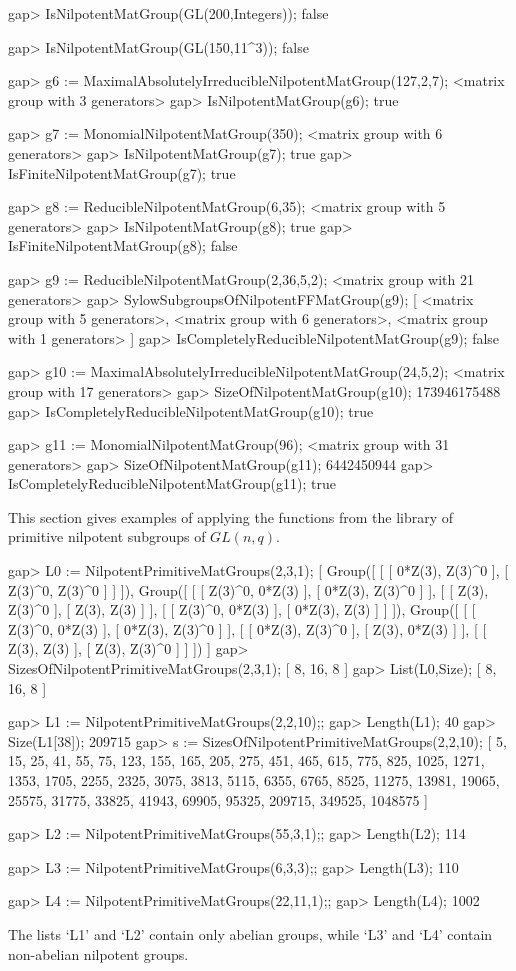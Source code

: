 \beginexample
gap> IsNilpotentMatGroup(GL(200,Integers));
false

gap> IsNilpotentMatGroup(GL(150,11^3));
false

gap> g6 := MaximalAbsolutelyIrreducibleNilpotentMatGroup(127,2,7);
<matrix group with 3 generators>
gap> IsNilpotentMatGroup(g6);
true

gap> g7 := MonomialNilpotentMatGroup(350);
<matrix group with 6 generators>
gap> IsNilpotentMatGroup(g7);
true
gap> IsFiniteNilpotentMatGroup(g7);
true

gap> g8 := ReducibleNilpotentMatGroup(6,35);
<matrix group with 5 generators>
gap> IsNilpotentMatGroup(g8);
true
gap> IsFiniteNilpotentMatGroup(g8);
false

gap> g9 := ReducibleNilpotentMatGroup(2,36,5,2);
<matrix group with 21 generators>
gap> SylowSubgroupsOfNilpotentFFMatGroup(g9);
[ <matrix group with 5 generators>, <matrix group with 6 generators>,
  <matrix group with 1 generators> ]
gap> IsCompletelyReducibleNilpotentMatGroup(g9);
false

gap> g10 := MaximalAbsolutelyIrreducibleNilpotentMatGroup(24,5,2);
<matrix group with 17 generators>
gap> SizeOfNilpotentMatGroup(g10);
173946175488
gap> IsCompletelyReducibleNilpotentMatGroup(g10);
true

gap> g11 := MonomialNilpotentMatGroup(96);
<matrix group with 31 generators>
gap> SizeOfNilpotentMatGroup(g11);
6442450944
gap> IsCompletelyReducibleNilpotentMatGroup(g11);
true
\endexample


This section gives examples of applying the functions from the
 library of primitive nilpotent subgroups of $GL(n,q)$.

\beginexample
gap> L0 := NilpotentPrimitiveMatGroups(2,3,1);
[ Group([ [ [ 0*Z(3), Z(3)^0 ], [ Z(3)^0, Z(3)^0 ] ] ]), 
  Group([ [ [ Z(3)^0, 0*Z(3) ], [ 0*Z(3), Z(3)^0 ] ], 
      [ [ Z(3), Z(3)^0 ], [ Z(3), Z(3) ] ], 
      [ [ Z(3)^0, 0*Z(3) ], [ 0*Z(3), Z(3) ] ] ]), 
  Group([ [ [ Z(3)^0, 0*Z(3) ], [ 0*Z(3), Z(3)^0 ] ], 
      [ [ 0*Z(3), Z(3)^0 ], [ Z(3), 0*Z(3) ] ], 
      [ [ Z(3), Z(3) ], [ Z(3), Z(3)^0 ] ] ]) ]
gap> SizesOfNilpotentPrimitiveMatGroups(2,3,1);
[ 8, 16, 8 ]
gap> List(L0,Size);
[ 8, 16, 8 ]

gap> L1 := NilpotentPrimitiveMatGroups(2,2,10);;
gap> Length(L1);
40
gap> Size(L1[38]);
209715
gap> s := SizesOfNilpotentPrimitiveMatGroups(2,2,10);
[ 5, 15, 25, 41, 55, 75, 123, 155, 165, 205, 275, 451, 465, 615, 775, 825, 
  1025, 1271, 1353, 1705, 2255, 2325, 3075, 3813, 5115, 6355, 6765, 8525, 
  11275, 13981, 19065, 25575, 31775, 33825, 41943, 69905, 95325, 209715, 
  349525, 1048575 ]

gap> L2 := NilpotentPrimitiveMatGroups(55,3,1);;
gap> Length(L2);
114

gap> L3 := NilpotentPrimitiveMatGroups(6,3,3);;
gap> Length(L3);
110

gap> L4 := NilpotentPrimitiveMatGroups(22,11,1);;
gap> Length(L4);
1002
\endexample

The lists `L1' and `L2' contain only abelian groups, while `L3' and
`L4' contain non-abelian nilpotent groups.
